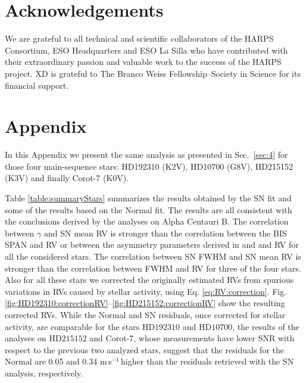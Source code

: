 \documentclass{aa}
\def\ms{\hbox{\,m\,s$^{-1}$}}         %
\begin{document}
\section{Acknowledgements}

We are grateful to all technical and scientific collaborators of the HARPS Consortium, ESO Headquarters and ESO La Silla who have contributed with their extraordinary passion and valuable work to the success of the HARPS project.
XD is grateful to The Branco Weiss Fellowship--Society in Science for its financial support.


\appendix
\section{Appendix} \label{appendix}

In this Appendix we present the same analysis as presented in Sec.~\ref{sec:4} for those four main-sequence stars: HD192310 (K2V), HD10700 (G8V), HD215152 (K3V) and finally Corot-7 (K0V).

Table \ref{table:summaryStars} summarizes the results obtained by the SN fit and some of the results based on the Normal fit. The results are all consistent with the conclusions derived by the analyses on Alpha Centauri B. The correlation between $\gamma$ and SN mean RV is stronger than the correlation between the BIS SPAN and RV or between the asymmetry parameters derived in \citet{Boisse-2009} and \citet{Figueira-2013} and RV for all the considered stars. The correlation between SN FWHM and SN mean RV is stronger than the correlation between FWHM and RV for three of the four stars.  Also for all these stars we corrected the originally estimated RVs from spurious variations in RVs caused by stellar activity, using Eq. \ref{eq:RV:correction}. Fig. \ref{fig:HD192310:correctionRV}--\ref{fig:HD215152:correctionRV} show the resulting corrected RVs. While the Normal and SN residuals, once corrected for stellar activity, are comparable for the stars $\text{HD}192310$ and $\text{HD}10700$, the results of the analyses on $\text{HD}215152$ and Corot-7, whose measurements have lower SNR with respect to the previous two analyzed stars, suggest that the residuals for the Normal are 0.05 and 0.34\,\ms\,higher than the residuals retrieved with the SN analysis, respectively.
\end{document}
